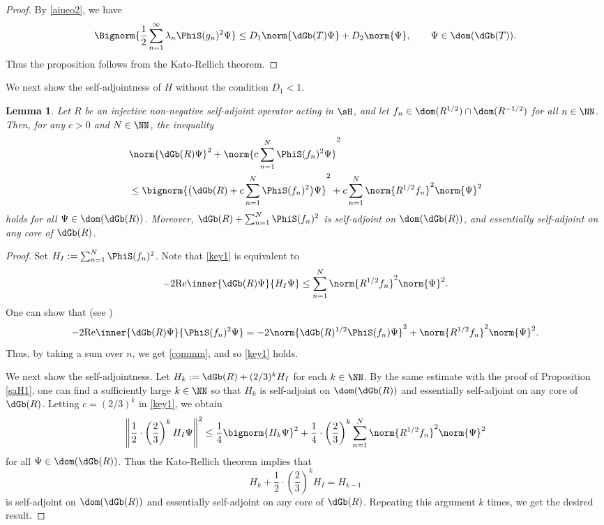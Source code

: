 \documentclass[12pt,draft]{article}
\theoremstyle{plain}
\newtheorem{lem}[theorem]{\bf Lemma}
\numberwithin{equation}{section}
\theoremstyle{remark}
\begin{document}
\begin{proof}
  By \eqref{aiueo2}, we have
\begin{align*}
 \Bignorm{\frac{1}{2}\sum_{n=1}^\infty\lambda_n\PhiS(g_n)^2\Psi}
 \leq D_1 \norm{\dGb(T)\Psi} + D_2\norm{\Psi}, \qquad \Psi\in\dom(\dGb(T)).
\end{align*}
Thus the proposition follows from the Kato-Rellich theorem.
\end{proof}

We next show the self-adjointness of $H$ without the condition $D_1<1$.

\begin{lem}{\label{saH2}}
 Let $R$ be an injective non-negative self-adjoint operator acting in $\sH$, 
and let $f_n\in\dom(R^{1/2})\cap \dom(R^{-1/2})$ for all $n\in\NN$.
Then, for any $c>0$ and $N\in\NN$, the inequality
\begin{align}
& \norm{\dGb(R)\Psi}^2 +  \norm{c\sum_{n=1}^N \PhiS(f_n)^2\Psi}^2  \notag \\
& \leq  \bignorm{\big(\dGb(R) + c\sum_{n=1}^N \PhiS(f_n)^2 \big)\Psi}^2 + c\sum_{n=1}^N\norm{R^{1/2}f_n}^2\norm{\Psi}^2 \label{key1}
\end{align}
holds for all $\Psi\in\dom(\dGb(R))$. 
Moreover, $\dGb(R)+\sum_{n=1}^N\PhiS(f_n)^2$ is self-adjoint on $\dom(\dGb(R))$,
and essentially self-adjoint on any core of $\dGb(R)$.
\end{lem}

\begin{proof}
Set $H_I := \sum_{n=1}^N\PhiS(f_n)^2$. Note that \eqref{key1} is equivalent to
\begin{align}
 -2\mathrm{Re} \inner{\dGb(R)\Psi}{H_I\Psi} 
 \leq \sum_{n=1}^N \norm{R^{1/2}f_n}^2 \norm{\Psi}^2. \label{commm}
\end{align}
One can show that (see \cite[Proposition 3.4]{ms05})
\begin{equation}\label{miyaosasaki}
  -2\mathrm{Re}\inner{\dGb(R)\Psi}{\PhiS(f_n)^2\Psi}
 = -2\norm{\dGb(R)^{1/2}\PhiS(f_n)\Psi}^2 + \norm{R^{1/2}f_n}^2\norm{\Psi}^2.
\end{equation}
Thus, by taking a sum over $n$, we get \eqref{commm}, and so \eqref{key1} holds.

We next show the self-adjointness.
Let $H_k:=\dGb(R)+(2/3)^k H_I$ for each $k\in\NN$.
By the same estimate with the proof of Proposition \ref{saH1}, one can find a sufficiently large $k\in\NN$ so that
$H_k$ is self-adjoint on $\dom(\dGb(R))$ and essentially self-adjoint on any core of $\dGb(R)$.
Letting $c=(2/3)^k$ in \eqref{key1}, we obtain
\[
\left\|\frac{1}{2}\cdot\left(\frac{2}{3}\right)^kH_I\Psi\right\|^2
 \leq  \frac{1}{4}\bignorm{H_k\Psi}^2 + \frac{1}{4}\cdot\left(\frac{2}{3}\right)^k\sum_{n=1}^N\norm{R^{1/2}f_n}^2\norm{\Psi}^2
\]
for all $\Psi\in\dom(\dGb(R))$.
Thus the Kato-Rellich theorem implies that 
\[
H_k+\frac{1}{2}\cdot\left(\frac{2}{3}\right)^kH_I = H_{k-1}
\]
is self-adjoint on $\dom(\dGb(R))$ and essentially self-adjoint on any core of $\dGb(R)$.
Repeating this argument $k$ times, we get the desired result.
\end{proof}
\end{document}

